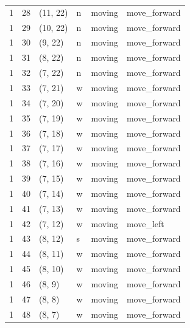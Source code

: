 \begin{table}[H]
\begin{tabular}{llllll}
1 & 28 & (11, 22) & n & moving & move\_forward \\
1 & 29 & (10, 22) & n & moving & move\_forward \\
1 & 30 & (9, 22)	 & n & moving & move\_forward \\
1 & 31 & (8, 22)	 & n & moving & move\_forward \\
1 & 32 & (7, 22)	 & n & moving & move\_forward \\
1 & 33 & (7, 21)	 & w & moving & move\_forward \\
1 & 34 & (7, 20)	 & w & moving & move\_forward \\
1 & 35 & (7, 19)	 & w & moving & move\_forward \\
1 & 36 & (7, 18)	 & w & moving & move\_forward \\
1 & 37 & (7, 17)	 & w & moving & move\_forward \\
1 & 38 & (7, 16)	 & w & moving & move\_forward \\
1 & 39 & (7, 15)	 & w & moving & move\_forward \\
1 & 40 & (7, 14)	 & w & moving & move\_forward \\
1 & 41 & (7, 13)	 & w & moving & move\_forward \\
1 & 42 & (7, 12)	 & w & moving & move\_left \\
1 & 43 & (8, 12)	 & s & moving & move\_forward \\
1 & 44 & (8, 11)	 & w & moving & move\_forward \\
1 & 45 & (8, 10)	 & w & moving & move\_forward \\
1 & 46 & (8, 9)	 & w & moving & move\_forward \\
1 & 47 & (8, 8)	 & w & moving & move\_forward \\
1 & 48 & (8, 7)	 & w & moving & move\_forward \\
    \bottomrule
  \end{tabular}
\end{table}

